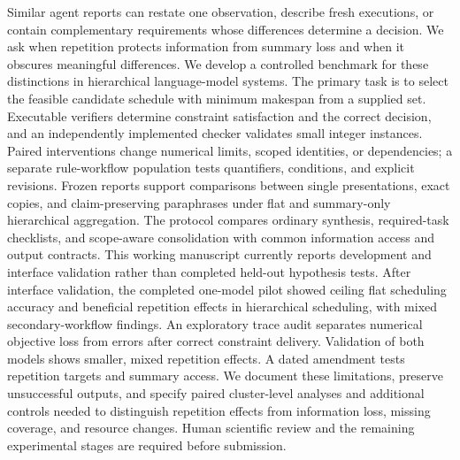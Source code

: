 Similar agent reports can restate one observation, describe fresh executions,
or contain complementary requirements whose differences determine a decision.
We ask when repetition protects information from summary loss and when it obscures
meaningful differences. We develop a controlled benchmark for these distinctions in hierarchical
language-model systems. The primary task is to select the feasible candidate
schedule with minimum makespan from a supplied set. Executable verifiers determine
constraint satisfaction and the correct decision, and an independently implemented
checker validates small integer instances. Paired interventions change numerical
limits, scoped identities, or dependencies; a separate rule-workflow population
tests quantifiers, conditions, and explicit revisions. Frozen reports support
comparisons between single presentations, exact copies, and claim-preserving
paraphrases under flat and summary-only hierarchical aggregation. The protocol
compares ordinary synthesis, required-task checklists, and scope-aware consolidation
with common information access and output contracts. This working manuscript
currently reports development and interface validation rather than completed
held-out hypothesis tests. After interface validation, the completed
one-model pilot showed ceiling flat scheduling accuracy and beneficial repetition
effects in hierarchical scheduling, with mixed secondary-workflow findings.
An exploratory trace audit separates numerical objective loss from errors after
correct constraint delivery. Validation of both models shows smaller, mixed repetition effects.
A dated amendment tests repetition targets and summary access.
We document these limitations, preserve unsuccessful outputs, and
specify paired cluster-level analyses and additional controls needed to distinguish
repetition effects from information loss, missing coverage, and resource changes.
Human scientific review and the remaining experimental stages are required before
submission.
